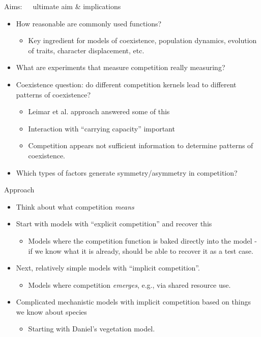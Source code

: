 \documentclass[12pt]{beamer}
\begin{document}
\begin{frame}[t]{Aims:~~~ultimate aim \& implications}
 \begin{itemize}
 \item How reasonable are commonly used
   functions?
   \begin{itemize}
   \item Key ingredient for models of coexistence, population
     dynamics, evolution of traits, character displacement, etc.
   \end{itemize}
 \item What are experiments that measure competition really
   measuring?
 \item Coexistence question: do different competition kernels lead
   to different patterns of coexistence?
   \begin{itemize}
   \item Leimar et al. approach answered some of this
   \item Interaction with ``carrying capacity'' important
   \item Competition appears not sufficient information to determine
     patterns of coexistence.
   \end{itemize}
 \item Which types of factors generate symmetry/asymmetry in
   competition?
 \end{itemize}
\end{frame}


\begin{frame}[t]{Approach}
  \begin{itemize}
  \item Think about what competition \emph{means}
  \item Start with models with ``explicit competition'' and recover
    this
    \begin{itemize}
    \item Models where the competition function is baked directly into
      the model - if we know what it is already, should be able to
      recover it as a test case.
    \end{itemize}
  \item Next, relatively simple models with ``implicit competition''.
    \begin{itemize}
    \item Models where competition \emph{emerges}, e.g., via shared
      resource use.
    \end{itemize}
  \item Complicated mechanistic models with implicit competition based
    on things we know about species
    \begin{itemize}
    \item Starting with Daniel's vegetation model.
    \end{itemize}
  \end{itemize}
\end{frame}
\end{document}
